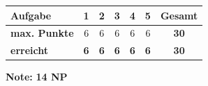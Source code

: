 \documentclass[11pt, a4paper]{article}
\newcommand{\lsg}[1]{\textcolor{loesung}{\textbf{#1}}}
\begin{document}
\noindent
\begin{tabularx}{\textwidth}{|X|c|c|c|c|c||c|}
\hline
\textbf{Aufgabe} & 1 & 2 & 3 & 4 & 5 & \textbf{Gesamt} \\
\hline
\textbf{max. Punkte} & 6 & 6 & 6 & 6 & 6 & \textbf{30} \\
\hline
\textbf{erreicht} & \lsg{6} & \lsg{6} & \lsg{6} & \lsg{6} & \lsg{6} & \lsg{30} \\[0.8em]
\hline
\end{tabularx}

\vspace{10pt}

\begin{flushright}
\textbf{Note:} \lsg{14 NP}
\end{flushright}
\end{document}

